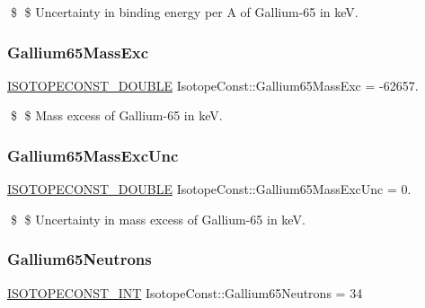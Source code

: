 \$ \$ Uncertainty in binding energy per A of Gallium-\/65 in keV. \mbox{\label{group___isotope_const-_gallium-_ga65_ga7cbbf872f9896bb955f3effd20b885c6}} 
\subsubsection{\texorpdfstring{Gallium65\+Mass\+Exc}{Gallium65MassExc}}
{\footnotesize\ttfamily \mbox{\hyperlink{group___isotope_const-_macros_ga8f45a7272ce02c0b4c65c44636ed719a}{I\+S\+O\+T\+O\+P\+E\+C\+O\+N\+S\+T\+\_\+\+D\+O\+U\+B\+LE}} Isotope\+Const\+::\+Gallium65\+Mass\+Exc = -\/62657.}

\$ \$ Mass excess of Gallium-\/65 in keV. \mbox{\label{group___isotope_const-_gallium-_ga65_ga79a99587dcdb5b0eb23fb31cffe18bfd}} 
\subsubsection{\texorpdfstring{Gallium65\+Mass\+Exc\+Unc}{Gallium65MassExcUnc}}
{\footnotesize\ttfamily \mbox{\hyperlink{group___isotope_const-_macros_ga8f45a7272ce02c0b4c65c44636ed719a}{I\+S\+O\+T\+O\+P\+E\+C\+O\+N\+S\+T\+\_\+\+D\+O\+U\+B\+LE}} Isotope\+Const\+::\+Gallium65\+Mass\+Exc\+Unc = 0.}

\$ \$ Uncertainty in mass excess of Gallium-\/65 in keV. \mbox{\label{group___isotope_const-_gallium-_ga65_ga2f73ea26996a3adab14ac84d05bc4aab}} 
\subsubsection{\texorpdfstring{Gallium65\+Neutrons}{Gallium65Neutrons}}
{\footnotesize\ttfamily \mbox{\hyperlink{group___isotope_const-_macros_ga5f18360b3e99483a35c32d789e62621c}{I\+S\+O\+T\+O\+P\+E\+C\+O\+N\+S\+T\+\_\+\+I\+NT}} Isotope\+Const\+::\+Gallium65\+Neutrons = 34}

